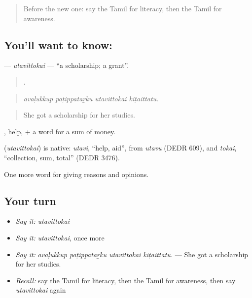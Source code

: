 \label{lesson:TA-C368-utavittokai}



\begin{quote}
Before the new one: say the Tamil for literacy, then the Tamil for awareness.
\end{quote}

\subsection*{You'll want to know: }
\textbf{} — \emph{utavittokai} — \textquotedblleft{}a scholarship; a grant\textquotedblright{}.

\begin{quote}
   .
\end{quote}

\begin{quote}
\emph{avaḷukkup paṭippataṟku utavittokai kiṭaittatu.}
\end{quote}

\begin{quote}
She got a scholarship for her studies.
\end{quote}

, help, + a word for a sum of money.

\begin{cousinweb}
\textbf{} (\emph{utavittokai}) is native: \emph{utavi}, \textquotedblleft{}help, aid\textquotedblright{}, from \emph{utavu} (DEDR 609), and \emph{tokai}, \textquotedblleft{}collection, sum, total\textquotedblright{} (DEDR 3476).
\end{cousinweb}

\begin{grammarlens}[title={What you've built}]
One more word for giving reasons and opinions.
\end{grammarlens}

\subsection*{Your turn}
\begin{itemize}
\raggedright
  \item \emph{Say it:} \emph{utavittokai}
  \item \emph{Say it:} \emph{utavittokai}, once more
  \item \emph{Say it:} \emph{avaḷukkup paṭippataṟku utavittokai kiṭaittatu.} — She got a scholarship for her studies.
  \item \emph{Recall:} say the Tamil for literacy, then the Tamil for awareness, then say \emph{utavittokai} again
\end{itemize}

